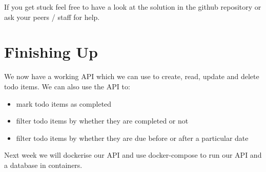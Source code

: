 \documentclass{csse4400}
\begin{document}
If you get stuck feel free to have a look at the solution in the github repository or ask your peers / staff for help.

\section{Finishing Up}

We now have a working API which we can use to create, read, update and delete todo items. We can also use the API to:

\begin{itemize}
  \item mark todo items as completed
  \item filter todo items by whether they are completed or not
  \item filter todo items by whether they are due before or after a particular date
\end{itemize}

Next week we will dockerise our API and use docker-compose to run our API and a database in containers.




\end{document}
